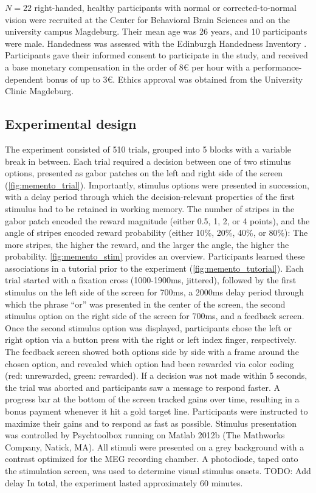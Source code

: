 $N = 22$ right-handed, healthy participants with normal or corrected-to-normal vision were recruited at the Center for Behavioral Brain Sciences and on the university campus Magdeburg.
Their mean age was 26 years, and 10 participants were male.
Handedness was assessed with the Edinburgh Handedness Inventory \citep{oldfield1971assessment}.
Participants gave their informed consent to participate in the study, and received a base monetary compensation in the order of 8€ per hour with a performance-dependent bonus of up to 3€.
Ethics approval was obtained from the University Clinic Magdeburg.

\subsection{Experimental design}

The experiment consisted of 510 trials, grouped into 5 blocks with a variable break in between.
Each trial required a decision between one of two stimulus options, presented as gabor patches on the left and right side of the screen (\cref{fig:memento_trial}).
Importantly, stimulus options were presented in succession, with a delay period through which the decision-relevant properties of the first stimulus had to be retained in working memory.
The number of stripes in the gabor patch encoded the reward magnitude (either 0.5, 1, 2, or 4 points), and the angle of stripes encoded reward probability (either 10\%, 20\%, 40\%, or 80\%): The more stripes, the higher the reward, and the larger the angle, the higher the probability.
\cref{fig:memento_stim} provides an overview.
Participants learned these associations in a tutorial prior to the experiment (\cref{fig:memento_tutorial}).
Each trial started with a fixation cross (1000-1900ms, jittered), followed by the first stimulus on the left side of the screen for 700ms, a 2000ms delay period through which the phrase ``or'' was presented in the center of the screen, the second stimulus option on the right side of the screen for 700ms, and a feedback screen.
Once the second stimulus option was displayed, participants chose the left or right option via a button press with the right or left index finger, respectively.
The feedback screen showed both options side by side with a frame around the chosen option, and revealed which option had been rewarded via color coding (red: unrewarded, green: rewarded).
If a decision was not made within 5 seconds, the trial was aborted and participants saw a message to respond faster.
A progress bar at the bottom of the screen tracked gains over time, resulting in a bonus payment whenever it hit a gold target line.
Participants were instructed to maximize their gains and to respond as fast as possible.
Stimulus presentation was controlled by Psychtoolbox \citep{kleiner2007s} running on Matlab 2012b (The Mathworks Company, Natick, MA).
All stimuli were presented on a grey background with a contrast optimized for the MEG recording chamber.
A photodiode, taped onto the stimulation screen, was used to determine visual stimulus onsets.
TODO: Add delay
In total, the experiment lasted approximately 60 minutes.

